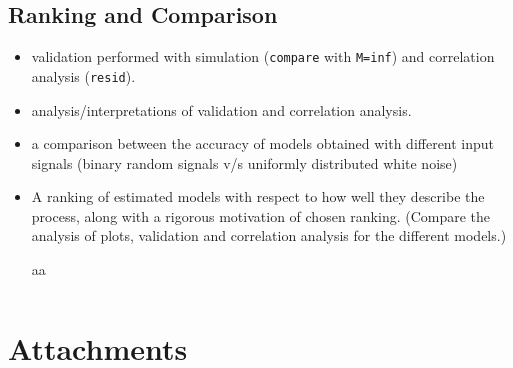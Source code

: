 \documentclass[10pt,a4paper]{article}
\begin{document}
\subsection{Ranking and Comparison}
\begin{itemize}
   \item validation performed with simulation (\texttt{compare} with \texttt{M=inf}) and correlation analysis (\texttt{resid}).
   \item analysis/interpretations of validation and correlation analysis.
   \item a comparison between the accuracy of models obtained with different input signals (binary random signals v/s uniformly distributed white noise)
   \item A ranking of estimated models with respect to how well they describe the process, along with a rigorous motivation of chosen ranking. (Compare the analysis of plots, validation and correlation analysis for the different models.)
	\begin{table}[h]
		\footnotesize
		\centering
		\caption{aa}
		\label{table:}
		\begin{tabular}{c}
		
		\end{tabular}
	\end{table}
\end{itemize}

\newpage
\section*{Attachments}
	\label{matlabCode}
    
	
	
	
\end{document}
